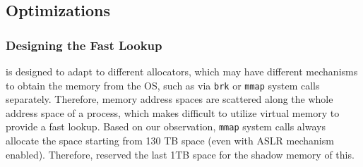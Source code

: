 \subsection{Optimizations}

\subsubsection{Designing the Fast Lookup}

\label{sec:fastlookup}

\MP{} is designed to adapt to different allocators, which may have different mechanisms to obtain the memory from the OS, such as via \texttt{brk} or \texttt{mmap} system calls separately. Therefore, memory address spaces are scattered along the whole address space of a process, which makes difficult to utilize virtual memory to provide a fast lookup. Based on our observation, \texttt{mmap} system calls always allocate the space starting from 130 TB space (even with ASLR mechanism enabled). Therefore, \MP{} reserved the last 1TB space for the shadow memory of this.   
